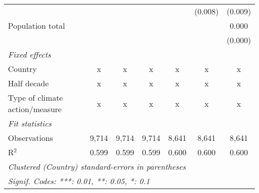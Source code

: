 \begin{tabular}{lcccccc}
                                            &               &               &               &               & (0.008)       & (0.009)\\   
   Population total                         &               &               &               &               &               & 0.000\\   
                                            &               &               &               &               &               & (0.000)\\   
   \emph{Fixed effects}\\
   Country                                  & x             & x             & x             & x             & x             & x\\  
   Half decade                              & x             & x             & x             & x             & x             & x\\  
   Type of climate action/measure           & x             & x             & x             & x             & x             & x\\  
   \midrule \emph{Fit statistics}\\
   Observations                             & 9,714         & 9,714         & 9,714         & 8,641         & 8,641         & 8,641\\  
   R$^2$                                    & 0.599         & 0.599         & 0.599         & 0.600         & 0.600         & 0.600\\  
   \midrule
   \multicolumn{7}{l}{\emph{Clustered (Country) standard-errors in parentheses}}\\
   \multicolumn{7}{l}{\emph{Signif. Codes: ***: 0.01, **: 0.05, *: 0.1}}\\
\end{tabular}
\par\endgroup


